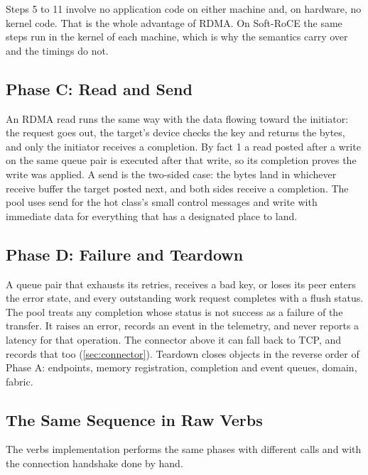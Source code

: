 Steps 5 to 11 involve no application code on either machine and, on hardware,
no kernel code. That is the whole advantage of RDMA. On Soft-RoCE the same
steps run in the kernel of each machine, which is why the semantics carry over
and the timings do not.

\subsection{Phase C: Read and Send}

An RDMA read runs the same way with the data flowing toward the initiator:
the request goes out, the target's device checks the key and returns the
bytes, and only the initiator receives a completion. By fact 1 a read posted
after a write on the same queue pair is executed after that write, so its
completion proves the write was applied. A send is the two-sided case: the
bytes land in whichever receive buffer the target posted next, and both sides receive a completion. The pool uses send for the hot class's small control
messages and write with immediate data for everything that has a designated
place to land.

\subsection{Phase D: Failure and Teardown}

A queue pair that exhausts its retries, receives a bad key, or loses its peer
enters the error state, and every outstanding work request completes with a
flush status. The pool treats any completion whose status is not success as a
failure of the transfer. It raises an error, records an event in the
telemetry, and never reports a latency for that operation. The connector
above it can fall back to TCP, and records that too (\cref{sec:connector}). Teardown closes objects in the reverse order of Phase A:
endpoints, memory registration, completion and event queues, domain, fabric.

\subsection{The Same Sequence in Raw Verbs}

The verbs implementation performs the same phases with different calls and
with the connection handshake done by hand.

